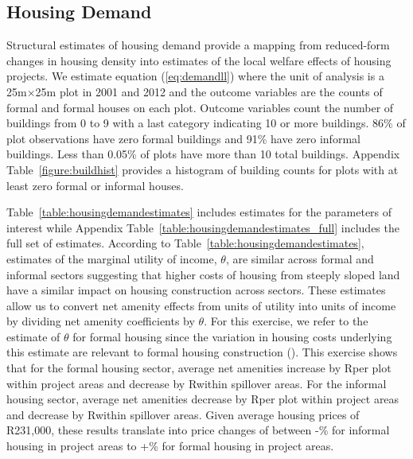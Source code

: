 \documentclass[12pt]{article}
\begin{document}
\subsection{Housing Demand}\label{section:demandestimates}

Structural estimates of housing demand provide a mapping from reduced-form changes in housing density into estimates of the local welfare effects of housing projects.  We estimate equation (\ref{eq:demandll}) where the unit of analysis is a 25m$\times$25m plot in 2001 and 2012 and the outcome variables are the counts of formal and formal houses on each plot.  Outcome variables count the number of buildings from 0 to 9 with a last category indicating 10 or more buildings.  86\% of plot observations have zero formal buildings and 91\% have zero informal buildings.  Less than 0.05\% of plots have more than 10 total buildings.  Appendix Table~\ref{figure:buildhist} provides a histogram of building counts for plots with at least zero formal or informal houses.  

Table~\ref{table:housingdemandestimates} includes estimates for the parameters of interest while Appendix Table~\ref{table:housingdemandestimates_full} includes the full set of estimates.  According to Table~\ref{table:housingdemandestimates}, estimates of the marginal utility of income, $\theta$, are similar across formal and informal sectors suggesting that higher costs of housing from steeply sloped land have a similar impact on housing construction across sectors.  These estimates allow us to convert net amenity effects from units of utility into units of income by dividing net amenity coefficients by $\theta$.  For this exercise, we refer to the estimate of $\theta$ for formal housing since the variation in housing costs underlying this estimate are relevant to formal housing construction (\cite{redbook}).  This exercise shows that for the formal housing sector, average net amenities increase by Rper plot within project areas and decrease by Rwithin spillover areas.  For the informal housing sector, average net amenities decrease by Rper plot within project areas and decrease by Rwithin spillover areas.  Given average housing prices of R231,000, these results translate into price changes of between -\unskip\% for informal housing in project areas to +\unskip\% for formal housing in project areas.  
\end{document}
